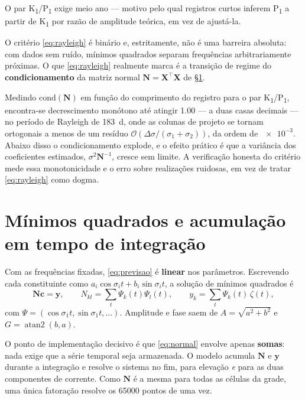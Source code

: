 \documentclass[11pt,a4paper,oneside]{report}
\theoremstyle{definition}
\theoremstyle{plain}
\theoremstyle{remark}
\newcommand{\vect}[1]{\bm{#1}}
\newcommand{\ordem}[1]{\mathcal{O}\!\left(#1\right)}
\DeclareMathOperator{\atantwo}{atan2}
\begin{document}
O par K\textsubscript{1}/P\textsubscript{1} exige meio ano — motivo pelo qual
registros curtos inferem P\textsubscript{1} a partir de K\textsubscript{1} por
razão de amplitude teórica, em vez de ajustá-la.

\begin{caixa}
O critério \eqref{eq:rayleigh} é binário e, estritamente, não é uma barreira
absoluta: com dados sem ruído, mínimos quadrados separam frequências
arbitrariamente próximas. O que \eqref{eq:rayleigh} realmente marca é a
transição de regime do \textbf{condicionamento} da matriz normal
$\vect{N}=\vect{X}^{\!\top}\vect{X}$ de \S\ref{sec:minimosquadrados}.

Medindo $\mathrm{cond}(\vect{N})$ em função do comprimento do registro para o
par K\textsubscript{1}/P\textsubscript{1}, encontra-se decrescimento monótono
até atingir \num{1.00} — a duas casas decimais — no período de Rayleigh de
\SI{183}{\day}, onde as colunas de projeto se tornam ortogonais a menos de um
resíduo $\ordem{\Delta\sigma/(\sigma_1+\sigma_2)}$, da ordem de
$\num{e-3}$. Abaixo disso o
condicionamento explode, e o efeito prático é que a variância dos coeficientes
estimados, $\sigma^{2}\vect{N}^{-1}$, cresce sem limite. A verificação honesta
do critério mede essa monotonicidade e o erro sobre realizações ruidosas, em vez
de tratar \eqref{eq:rayleigh} como dogma.
\end{caixa}

\section{Mínimos quadrados e acumulação em tempo de integração}
\label{sec:minimosquadrados}

Com as frequências fixadas, \eqref{eq:previsao} é \textbf{linear} nos
parâmetros. Escrevendo cada constituinte como
$a_i\cos\sigma_i t+b_i\sin\sigma_i t$, a solução de mínimos quadrados é
\begin{equation}
\vect{N}\vect{c}=\vect{y},\qquad
N_{kl}=\sum_{t}\Psi_k(t)\Psi_l(t),\qquad
y_k=\sum_{t}\Psi_k(t)\,\zeta(t),
\label{eq:normal}
\end{equation}
com $\Psi=(\cos\sigma_1 t,\sin\sigma_1 t,\dots)$. Amplitude e fase saem de
$A=\sqrt{a^{2}+b^{2}}$ e $G=\atantwo(b,a)$.

O ponto de implementação decisivo é que \eqref{eq:normal} envolve apenas
\textbf{somas}: nada exige que a série temporal seja armazenada. O modelo
acumula $\vect{N}$ e $\vect{y}$ durante a integração e resolve o sistema no
fim, para elevação \emph{e} para as duas componentes de corrente. Como
$\vect{N}$ é a mesma para todas as células da grade, uma única fatoração
resolve os \num{65000} pontos de uma vez.
\end{document}
